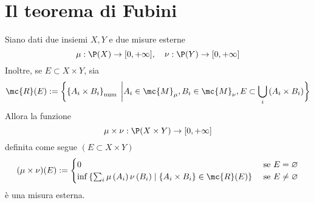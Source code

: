 \section{Il teorema di Fubini}
\begin{proposition}[$* *$]\label{prop: 2.5}
    Siano dati due insiemi $X, Y$ e due misure esterne
    \[\mu: \P(X) \rightarrow[0,+\infty], \quad \nu: \P(Y) \rightarrow[0,+\infty]\]
    Inoltre, se $E \subset X \times Y$, sia
    \[\mc{R}(E):=\biggl\{\left\{A_{i} \times B_{i}\right\}_{\text {num }} \bigg|A_{i} \in \mc{M}_{\mu}, B_{i} \in \mc{M}_{\nu}, E \subset \bigcup_{i}\left(A_{i} \times B_{i}\right)\biggr\}\]
    Allora la funzione
    \[\mu \times \nu: \P(X \times Y) \rightarrow[0,+\infty]\]
    definita come segue $(E \subset X \times Y)$
    \[(\mu \times \nu)(E):= \begin{cases}0 & \text { se } E=\varnothing \\ \inf \left\{\sum_{i} \mu\left(A_{i}\right) \nu\left(B_{i}\right) \mid\left\{A_{i} \times B_{i}\right\} \in \mc{R}(E)\right\} & \text { se } E \neq \varnothing\end{cases}\]
    è una misura esterna.
\end{proposition}
